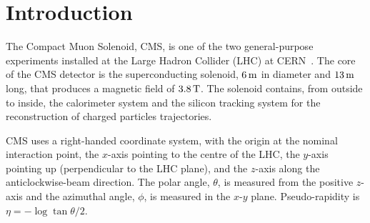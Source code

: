 \section{Introduction}
\label{introduction}

The Compact Muon Solenoid, CMS, is one of the two general-purpose
experiments installed at the Large Hadron Collider (LHC) at
CERN~\cite{cms}. The core of the CMS detector is
the superconducting solenoid, $6\rm \, m$ in diameter and $13\rm \, m$ long, that
produces a magnetic field of $3.8\rm \, T$. The solenoid contains, from
outside to inside, the calorimeter system and the silicon 
tracking system for the reconstruction of charged particles
trajectories.

CMS uses a right-handed coordinate system, with the origin at the
nominal interaction point, the $x$-axis pointing to the centre of the
LHC, the $y$-axis pointing up (perpendicular to the LHC plane), and
the $z$-axis along the anticlockwise-beam direction. The polar angle,
$\theta$, is measured from the positive $z$-axis and the azimuthal
angle, $\phi$, is measured in the $x$-$y$ plane. Pseudo-rapidity is
$\eta = -\log \tan \theta/2$.

